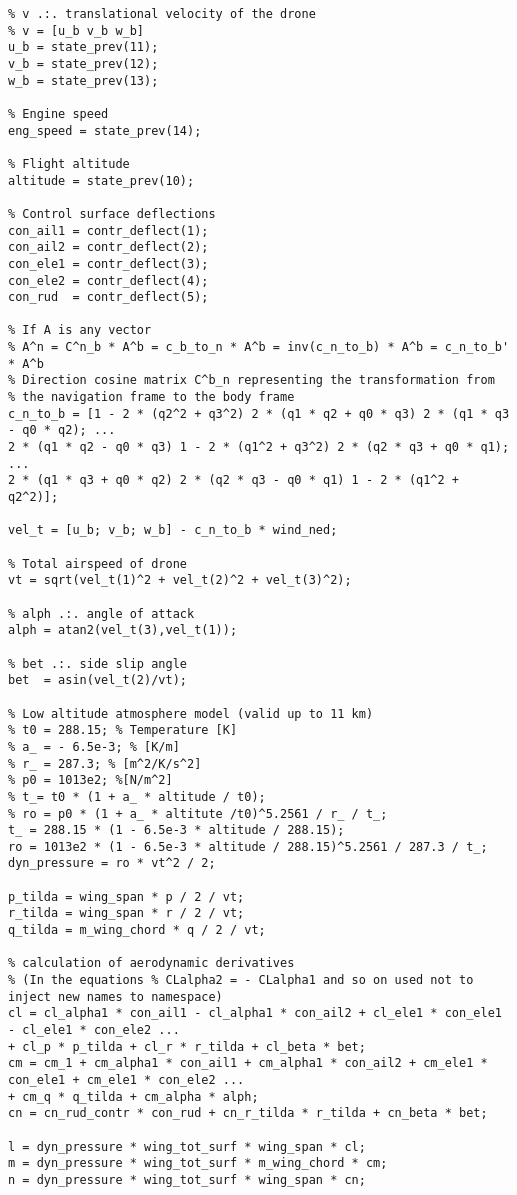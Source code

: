 \begin{lstlisting}
% v .:. translational velocity of the drone
% v = [u_b v_b w_b]
u_b = state_prev(11);
v_b = state_prev(12);
w_b = state_prev(13);

% Engine speed
eng_speed = state_prev(14);

% Flight altitude
altitude = state_prev(10);

% Control surface deflections
con_ail1 = contr_deflect(1);
con_ail2 = contr_deflect(2);
con_ele1 = contr_deflect(3);
con_ele2 = contr_deflect(4);
con_rud  = contr_deflect(5);

% If A is any vector
% A^n = C^n_b * A^b = c_b_to_n * A^b = inv(c_n_to_b) * A^b = c_n_to_b' * A^b
% Direction cosine matrix C^b_n representing the transformation from
% the navigation frame to the body frame
c_n_to_b = [1 - 2 * (q2^2 + q3^2) 2 * (q1 * q2 + q0 * q3) 2 * (q1 * q3 - q0 * q2); ...
2 * (q1 * q2 - q0 * q3) 1 - 2 * (q1^2 + q3^2) 2 * (q2 * q3 + q0 * q1); ...
2 * (q1 * q3 + q0 * q2) 2 * (q2 * q3 - q0 * q1) 1 - 2 * (q1^2 + q2^2)];

vel_t = [u_b; v_b; w_b] - c_n_to_b * wind_ned;

% Total airspeed of drone
vt = sqrt(vel_t(1)^2 + vel_t(2)^2 + vel_t(3)^2);

% alph .:. angle of attack
alph = atan2(vel_t(3),vel_t(1));

% bet .:. side slip angle
bet  = asin(vel_t(2)/vt);

% Low altitude atmosphere model (valid up to 11 km)
% t0 = 288.15; % Temperature [K]
% a_ = - 6.5e-3; % [K/m]
% r_ = 287.3; % [m^2/K/s^2] 
% p0 = 1013e2; %[N/m^2]
% t_= t0 * (1 + a_ * altitude / t0);
% ro = p0 * (1 + a_ * altitute /t0)^5.2561 / r_ / t_;
t_ = 288.15 * (1 - 6.5e-3 * altitude / 288.15);
ro = 1013e2 * (1 - 6.5e-3 * altitude / 288.15)^5.2561 / 287.3 / t_;
dyn_pressure = ro * vt^2 / 2;

p_tilda = wing_span * p / 2 / vt;
r_tilda = wing_span * r / 2 / vt;
q_tilda = m_wing_chord * q / 2 / vt;

% calculation of aerodynamic derivatives
% (In the equations % CLalpha2 = - CLalpha1 and so on used not to inject new names to namespace)
cl = cl_alpha1 * con_ail1 - cl_alpha1 * con_ail2 + cl_ele1 * con_ele1 - cl_ele1 * con_ele2 ...
+ cl_p * p_tilda + cl_r * r_tilda + cl_beta * bet;
cm = cm_1 + cm_alpha1 * con_ail1 + cm_alpha1 * con_ail2 + cm_ele1 * con_ele1 + cm_ele1 * con_ele2 ...
+ cm_q * q_tilda + cm_alpha * alph;
cn = cn_rud_contr * con_rud + cn_r_tilda * r_tilda + cn_beta * bet;

l = dyn_pressure * wing_tot_surf * wing_span * cl;
m = dyn_pressure * wing_tot_surf * m_wing_chord * cm;
n = dyn_pressure * wing_tot_surf * wing_span * cn;


\end{lstlisting}
